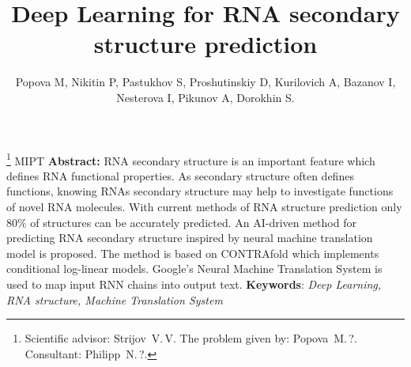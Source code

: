 \documentclass[12pt,twoside]{article}
\begin{document}
\title
{Deep Learning for RNA secondary structure prediction}
\author
[Popova M, Nikitin P, Pastukhov S, Proshutinskiy D, Kurilovich A, Bazanov I, Nesterova I, Pikunov A, Dorokhin S.] %
{Popova M, Nikitin P, Pastukhov S, Proshutinskiy D, Kurilovich A, Bazanov I, Nesterova I, Pikunov A, Dorokhin S.} %
\thanks
{Scientific advisor:  Strijov~V.\,V.
The problem given by:  Popova~M.\,?.
Consultant: Philipp~N.\,?.}
\organization
{MIPT}
\abstract
{
    \textbf{Abstract:}
        RNA secondary structure is an important feature which defines RNA functional properties. As secondary structure often defines functions, knowing RNAs secondary structure may help to investigate functions of novel RNA molecules. With current methods of RNA structure prediction only 80\% of structures can be accurately predicted. An AI-driven method for predicting RNA secondary structure inspired by neural machine translation model is proposed. The method is based on CONTRAfold which implements conditional log-linear models. Google's Neural Machine Translation System is used to map input RNN chains into output text. 
\textbf{Keywords}: \emph {Deep Learning, RNA structure, Machine Translation System}
}
\maketitle
\end{document}
